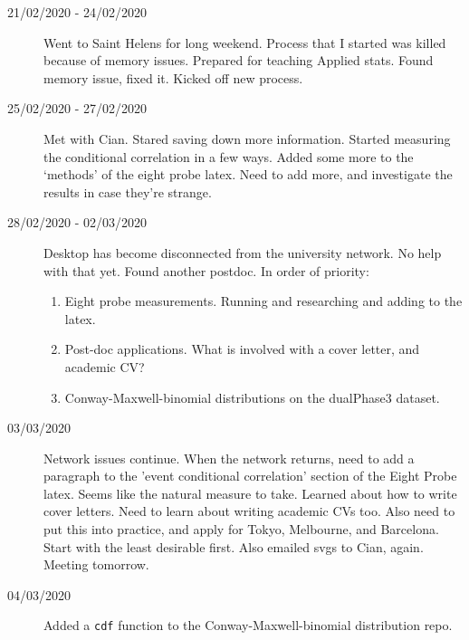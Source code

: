 \documentclass[a4paper,12pt]{article}
\theoremstyle{definition}
\begin{document}
\begin{description}
                                \item[21/02/2020 - 24/02/2020] Went to Saint Helens for long weekend. Process that I started was killed because of memory issues. Prepared for teaching Applied stats. Found memory issue, fixed it. Kicked off new process.

                                \item[25/02/2020 - 27/02/2020] Met with Cian. Stared saving down more information. Started measuring the conditional correlation in a few ways. Added some more to the `methods' of the eight probe latex. Need to add more, and investigate the results in case they're strange.

                                \item[28/02/2020 - 02/03/2020] Desktop has become disconnected from the university network. No help with that yet. Found another postdoc. In order of priority:
                                  \begin{enumerate}
                                      \item Eight probe measurements. Running and researching and adding to the latex.
                                      \item Post-doc applications. What is involved with a cover letter, and academic CV?
                                      \item Conway-Maxwell-binomial distributions on the dualPhase3 dataset.
                                  \end{enumerate}

                                \item[03/03/2020] Network issues continue. When the network returns, need to add a paragraph to the 'event conditional correlation' section of the Eight Probe latex. Seems like the natural measure to take. Learned about how to write cover letters. Need to learn about writing academic CVs too. Also need to put this into practice, and apply for Tokyo, Melbourne, and Barcelona. Start with the least desirable first. Also emailed svgs to Cian, again. Meeting tomorrow.

                                \item[04/03/2020] Added a \texttt{cdf} function to the Conway-Maxwell-binomial distribution repo.
                                
                                



  \end{description}
\end{document}
